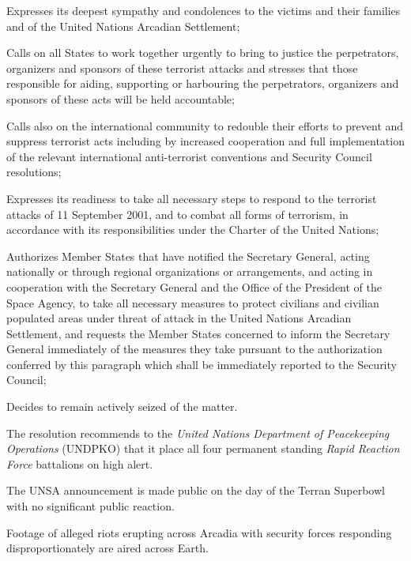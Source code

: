 \item Expresses its deepest sympathy and condolences to the victims and their families and of the United Nations Arcadian Settlement;

\item Calls on all States to work together urgently to bring to justice the perpetrators, organizers and sponsors of these terrorist attacks and stresses that those responsible for aiding, supporting or harbouring the perpetrators, organizers and sponsors of these acts will be held accountable;

\item Calls also on the international community to redouble their efforts to prevent and suppress terrorist acts including by increased cooperation and full implementation of the relevant international anti-terrorist conventions and Security Council resolutions;

\item Expresses its readiness to take all necessary steps to respond to the terrorist attacks of 11 September 2001, and to combat all forms of terrorism, in accordance with its responsibilities under the Charter of the United Nations;

\item Authorizes Member States that have notified the Secretary General, acting nationally or through regional organizations or arrangements, and acting in cooperation with the Secretary General and the Office of the President of the Space Agency, to take all necessary measures to protect civilians and civilian populated areas under threat of attack in the United Nations Arcadian Settlement, and requests the Member States concerned to inform the Secretary General immediately of the measures they take pursuant to the authorization conferred by this paragraph which shall be immediately reported to the Security Council;

\item Decides to remain actively seized of the matter.
\stopitemize
\stopTimelineDocument

The resolution recommends to the {\it United Nations Department of Peacekeeping Operations} (UNDPKO) that it place all four permanent standing {\it Rapid Reaction Force} battalions on high alert.

The UNSA announcement is made public on the day of the Terran Superbowl with no significant public reaction.
\StopTimelineDate

Footage of alleged riots erupting across Arcadia with security forces responding disproportionately are aired across Earth.
\StopTimelineDate

